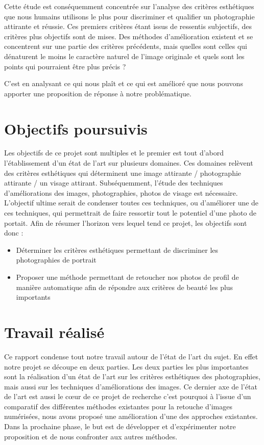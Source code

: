 \documentclass[11pt, french,screen]{report-rd-info}
\begin{document}
Cette étude est conséquemment concentrée sur l'analyse des critères esthétiques que nous humains utilisons le plus pour discriminer et qualifier un photographie attirante et réussie. Ces premiers critères étant issus de ressentis subjectifs, des critères plus objectifs sont de mises.
Des méthodes d'amélioration existent et se concentrent sur une partie des critères précédents, mais quelles sont celles qui dénaturent le moins le caractère naturel de l'image originale et quels sont les points qui pourraient être plus précis ?

C'est en analysant ce qui nous plaît et ce qui est amélioré que nous pouvons apporter une proposition de réponse à notre problématique.
\section{Objectifs poursuivis}
Les objectifs de ce projet sont multiples et le premier est tout d'abord l'établissement d'un état de l'art sur plusieurs domaines. Ces domaines relèvent des critères esthétiques qui déterminent une image attirante / photographie attirante / un visage attirant. Subséquemment, l'étude des techniques d'améliorations des images, photographies, photos de visage est nécessaire. L'objectif ultime serait de condenser toutes ces techniques, ou d'améliorer une de ces techniques, qui permettrait de faire ressortir tout le potentiel d'une photo de portait. Afin de résumer l'horizon vers lequel tend ce projet, les objectifs sont donc :
\begin{itemize}
\item Déterminer les critères esthétiques permettant de discriminer les photographies de portrait
\item Proposer une méthode permettant de retoucher nos photos de profil de manière automatique afin de répondre aux critères de beauté les plus importants
\end{itemize}
\section{Travail réalisé}
Ce rapport condense tout notre travail autour de l'état de l'art du sujet. En effet notre projet se découpe en deux parties. Les deux parties les plus importantes sont la réalisation d'un état de l'art sur les critères esthétiques des photographies, mais aussi sur les techniques d'améliorations des images. Ce dernier axe de l'état de l'art est aussi le cœur de ce projet de recherche c'est pourquoi à l'issue d'un comparatif des différentes méthodes existantes pour la retouche d'images numérisées, nous avons proposé une amélioration d'une des approches existantes.
Dans la prochaine phase, le but est de développer et d'expérimenter notre proposition et de nous confronter aux autres méthodes.
\end{document}
